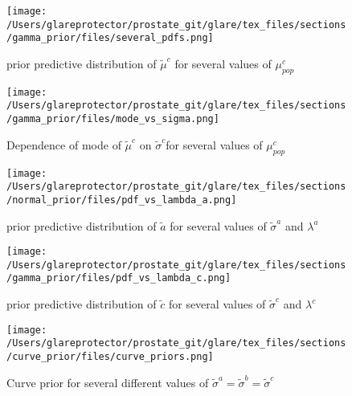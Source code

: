 \documentclass[a4paper,10pt]{article}
\begin{document}
\begin{figure}
\begin{center}
\texttt{[image: /Users/glareprotector/prostate\_git/glare/tex\_files/sections/gamma\_prior/files/several\_pdfs.png]}
\caption{prior predictive distribution of $\tilde{\mu}^c$ for several values of $\mu_{pop}^c$}
\end{center}
\end{figure}

\begin{figure}
\begin{center}
\texttt{[image: /Users/glareprotector/prostate\_git/glare/tex\_files/sections/gamma\_prior/files/mode\_vs\_sigma.png]}
\caption{Dependence of mode of $\tilde{\mu}^c$ on $\tilde{\sigma}^c $for several values of $\mu_{pop}^c$}
\end{center}
\end{figure}

\begin{figure}
\begin{center}
\texttt{[image: /Users/glareprotector/prostate\_git/glare/tex\_files/sections/normal\_prior/files/pdf\_vs\_lambda\_a.png]}
\caption{prior predictive distribution of $\tilde{a}$ for several values of $\tilde{\sigma}^a$ and $\lambda^a$}
\end{center}
\end{figure}

\begin{figure}
\begin{center}
\texttt{[image: /Users/glareprotector/prostate\_git/glare/tex\_files/sections/gamma\_prior/files/pdf\_vs\_lambda\_c.png]}
\caption{prior predictive distribution of $\tilde{c}$ for several values of $\tilde{\sigma}^c$ and $\lambda^c$}
\end{center}
\end{figure}

\begin{figure}
\begin{center}
\texttt{[image: /Users/glareprotector/prostate\_git/glare/tex\_files/sections/curve\_prior/files/curve\_priors.png]}
\caption{Curve prior for several different values of $\tilde{\sigma}^a=\tilde{\sigma}^b=\tilde{\sigma}^c$}
\end{center}
\end{figure}
\end{document}

